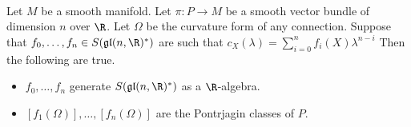 \documentclass[a4paper]{article}
\begin{document}
\begin{prp}{}{}\\
Let $M$ be a smooth manifold. Let $\pi:P\to M$ be a smooth vector bundle of dimension $n$ over $\R$. Let $\Omega$ be the curvature form of any connection. Suppose that $f_0,\dots,f_n\in S(\mathfrak{gl}(n,\R)^\ast)$ are such that $c_X(\lambda)=\sum_{i=0}^nf_i(X)\lambda^{n-i}$ Then the following are true. 
\begin{itemize}
\item $f_0,\dots,f_n$ generate $S(\mathfrak{gl}(n,\R)^\ast)$ as a $\R$-algebra. 
\item $[f_1(\Omega)],\dots,[f_n(\Omega)]$ are the Pontrjagin classes of $P$. 
\end{itemize}
\end{prp}
\end{document}
